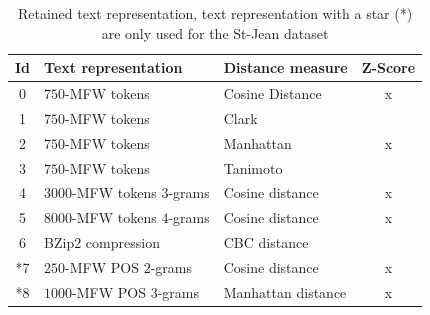 \begin{table}
  \centering
  \caption{Retained text representation, text representation with a star (*) are only used for the St-Jean dataset}
  \label{tab:9rl}
  \begin{tabular}{c l l c}
    \toprule
    Id &
    Text representation &
    Distance measure &
    Z-Score \\
    \midrule
    0 & $750$-MFW tokens & Cosine Distance & x\\
    1 & $750$-MFW tokens & Clark & \\
    2 & $750$-MFW tokens & Manhattan & x\\
    3 & $750$-MFW tokens & Tanimoto & \\
    4 & $3000$-MFW tokens $3$-grams & Cosine distance & x\\
    5 & $8000$-MFW tokens $4$-grams & Cosine distance & x\\
    6 & BZip2 compression & CBC distance & \\
    *7 & $250$-MFW POS $2$-grams & Cosine distance & x\\
    *8 & $1000$-MFW POS $3$-grams & Manhattan distance & x\\
    \bottomrule
  \end{tabular}
\end{table}
